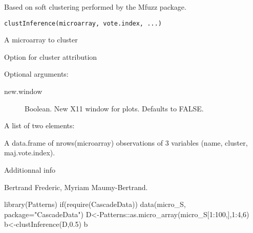 \documentclass[a4paper]{book}
\begin{document}
%
\begin{Description}\relax
Based on soft clustering performed by the Mfuzz package.
\end{Description}
%
\begin{Usage}
\begin{verbatim}
clustInference(microarray, vote.index, ...)
\end{verbatim}
\end{Usage}
%
\begin{Arguments}
\begin{ldescription}
\item[\code{microarray}] A microarray to cluster
\item[\code{vote.index}] Option for cluster attribution
\item[\code{...}] 
Optional arguments: 	  	
\begin{description}
 
\item[new.window] Boolean. New X11 window for plots. Defaults to FALSE.

\end{description}


\end{ldescription}
\end{Arguments}
%
\begin{Value}
A list of two elements:
\begin{ldescription}
\item[\code{res.matrix}] A data.frame of nrows(microarray) observations of 3 variables (name, cluster, maj.vote.index).
\item[\code{prop.matrix}] Additionnal info
\end{ldescription}
\end{Value}
%
\begin{Author}\relax
Bertrand Frederic, Myriam Maumy-Bertrand.
\end{Author}
%
\begin{Examples}
\begin{ExampleCode}
library(Patterns)
if(require(CascadeData)){
data(micro_S, package="CascadeData")
D<-Patterns::as.micro_array(micro_S[1:100,],1:4,6)
b<-clustInference(D,0.5)
b
}
\end{ExampleCode}
\end{Examples}
\end{document}
